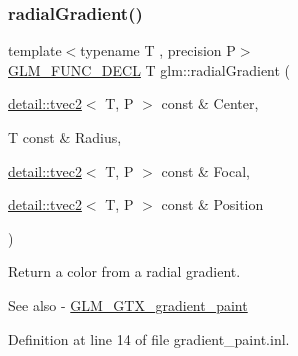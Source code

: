 \subsubsection{\texorpdfstring{radial\+Gradient()}{radialGradient()}}
{\footnotesize\ttfamily template$<$typename T , precision P$>$ \\
\hyperlink{setup_8hpp_ab2d052de21a70539923e9bcbf6e83a51}{G\+L\+M\+\_\+\+F\+U\+N\+C\+\_\+\+D\+E\+CL} T glm\+::radial\+Gradient (\begin{DoxyParamCaption}\item[{\hyperlink{structglm_1_1detail_1_1tvec2}{detail\+::tvec2}$<$ T, P $>$ const \&}]{Center,  }\item[{T const \&}]{Radius,  }\item[{\hyperlink{structglm_1_1detail_1_1tvec2}{detail\+::tvec2}$<$ T, P $>$ const \&}]{Focal,  }\item[{\hyperlink{structglm_1_1detail_1_1tvec2}{detail\+::tvec2}$<$ T, P $>$ const \&}]{Position }\end{DoxyParamCaption})}

Return a color from a radial gradient. \begin{DoxySeeAlso}{See also}
-\/ \hyperlink{group__gtx__gradient__paint}{G\+L\+M\+\_\+\+G\+T\+X\+\_\+gradient\+\_\+paint} 
\end{DoxySeeAlso}


Definition at line 14 of file gradient\+\_\+paint.\+inl.

